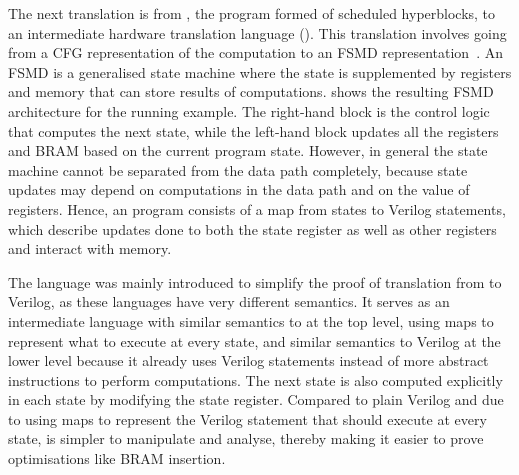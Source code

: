 The next translation is from \rtlpar{}, the program formed of scheduled
hyperblocks, to an intermediate hardware translation language (\htl{}).  This
translation involves going from a \gls{CFG} representation of the computation to
an \gls{FSMD} representation~\cite{hwang99_ffplp}. An \gls{FSMD} is a
generalised state machine where the state is supplemented by registers and
memory that can store results of computations.  
shows the resulting \gls{FSMD} architecture for the running example. The
right-hand block is the control logic that computes the next state, while the
left-hand block updates all the registers and \gls{BRAM} based on the current
program state.  However, in general the state machine cannot be separated from
the data path completely, because state updates may depend on computations in
the data path and on the value of registers.  Hence, an \htl{} program consists
of a map from states to Verilog statements, which describe updates done to both
the state register as well as other registers and interact with memory.

The \htl{} language was mainly introduced to simplify the proof of translation
from \rtl{} to Verilog, as these languages have very different semantics.  It
serves as an intermediate language with similar semantics to \rtl{} at the top
level, using maps to represent what to execute at every state, and similar
semantics to Verilog at the lower level because it already uses Verilog
statements instead of more abstract instructions to perform computations.  The
next state is also computed explicitly in each state by modifying the state
register.  Compared to plain Verilog and due to using maps to represent the
Verilog statement that should execute at every state, \htl{} is simpler to
manipulate and analyse, thereby making it easier to prove optimisations like
\gls{BRAM} insertion.

